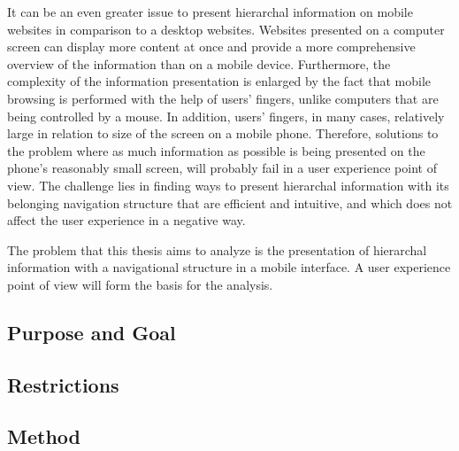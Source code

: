 It can be an even greater issue to present hierarchal information on mobile websites in comparison to a desktop websites. Websites presented on a computer screen can display more content at once and provide a more comprehensive overview of the information than on a mobile device. Furthermore, the complexity of the information presentation is enlarged by the fact that mobile browsing is performed with the help of users’ fingers, unlike computers that are being controlled by a mouse. In addition, users’ fingers, in many cases, relatively large in relation to size of the screen on a mobile phone. Therefore, solutions to the problem where as much information as possible is being presented on the phone's reasonably small screen, will probably fail in a user experience point of view. The challenge lies in finding ways to present hierarchal information with its belonging navigation structure that are efficient and intuitive, and which does not affect the user experience in a negative way. 

The problem that this thesis aims to analyze is the presentation of hierarchal information with a navigational structure in a mobile interface. A user experience point of view will form the basis for the analysis.
\subsection{Purpose and Goal}

\subsection{Restrictions}

\subsection{Method}
